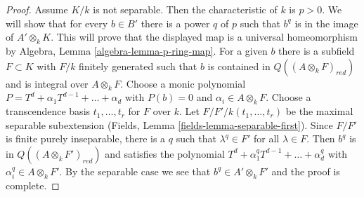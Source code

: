 \begin{proof}
\medskip\noindent
Assume $K/k$ is not separable. Then the characteristic of $k$ is $p > 0$.
We will show that for every $b \in B'$ there is a power $q$ of $p$
such that $b^q$ is in the image of $A' \otimes_k K$. This will prove
that the displayed map is a universal homeomorphism by
Algebra, Lemma \ref{algebra-lemma-p-ring-map}.
For a given $b$ there is a subfield $F \subset K$
with $F/k$ finitely generated such that $b$ is contained in
$Q((A \otimes_k F)_{red})$ and is integral over $A \otimes_k F$.
Choose a monic polynomial $P = T^d + \alpha_1 T^{d - 1} + \ldots + \alpha _d$
with $P(b) = 0$ and $\alpha_i \in A \otimes_k F$.
Choose a transcendence basis $t_1, \ldots, t_r$ for $F$ over $k$.
Let $F/F'/k(t_1, \ldots, t_r)$ be the maximal separable
subextension (Fields,  Lemma \ref{fields-lemma-separable-first}).
Since $F/F'$ is finite purely inseparable, there is a $q$ such
that $\lambda^q \in F'$ for all $\lambda \in F$. Then $b^q$ is
in $Q((A \otimes_k F')_{red})$ and satisfies the polynomial
$T^d + \alpha_1^q T^{d - 1} + \ldots + \alpha _d^q$ with
$\alpha_i^q \in A \otimes_k F'$. By the separable case
we see that $b^q \in A' \otimes_k F'$ and the proof is complete.
\end{proof}